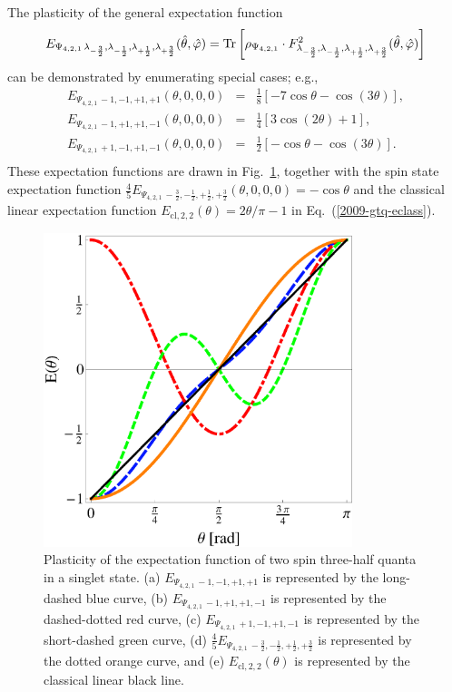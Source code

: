 \documentclass[pra,amsfonts,showpacs,showkeys,preprint]{revtex4}
\begin{document}
The plasticity of the general expectation function
\begin{equation}
E_{{ \Psi_{4,2,1}}\,\lambda_{-\frac{3}{2}},\lambda_{-\frac{1}{2}}, \lambda_{+\frac{1}{2}}, \lambda_{+\frac{3}{2}} } ({\hat \theta},{\hat \varphi} )
=
{\rm Tr}\left[ \rho_{ \Psi_{4,2,1}} \cdot  F^2_{\lambda_{-\frac{3}{2}},\lambda_{-\frac{1}{2}}, \lambda_{+\frac{1}{2}}, \lambda_{+\frac{3}{2}} } ({\hat \theta},{\hat \varphi})\right]
\label{2009-gtq-gpe4}
\end{equation}
can be demonstrated by enumerating special cases; e.g.,
\begin{equation}
\begin{array}{rcl}
E_{{ \Psi_{4,2,1}}\,-1,-1, +1, +1 } ( \theta ,0,0,0 )
&=& \frac{1}{8} \left[-7 \cos \theta -\cos (3 \theta )\right]
,
\\
E_{{ \Psi_{4,2,1}}\,-1,+1, +1, -1 } ( \theta ,0,0,0 )
&=& \frac{1}{4} \left[3 \cos (2 \theta )+1\right]
,
\\
E_{{ \Psi_{4,2,1}}\,+1,-1, +1, -1 } ( \theta ,0,0,0 )
&=& \frac{1}{2} \left[-\cos \theta -\cos (3 \theta )\right]
.
\\
\end{array}
\label{2009-gtq-e4-plast}
\end{equation}
These  expectation functions are drawn in Fig.~\ref{2009-gtq-gr4},
together with the spin state expectation function
$\frac{4}{5}E_{{ \Psi_{4,2,1}}\,-\frac{3}{2},-\frac{1}{2}, +\frac{1}{2}, +\frac{3}{2} }
( \theta ,0,0,0 ) = -\cos \theta $
and the classical linear expectation function
$E_{\text{cl},2,2}(\theta ) = {2 \theta / \pi} - 1$
in Eq.~(\ref{2009-gtq-eclass}).
\begin{figure}[htbp]
  \centering
\includegraphics[width=90mm]{2009-gtq-gr4}
\caption{Plasticity of the expectation function of two spin three-half quanta in a singlet state.
(a) $E_{{ \Psi_{4,2,1}}\,-1,-1, +1, +1 }$ is represented by the long-dashed blue curve,
(b) $E_{{ \Psi_{4,2,1}}\,-1,+1, +1, -1  }$ is represented by the dashed-dotted red curve,
(c) $E_{{ \Psi_{4,2,1}}\,+1,-1, +1, -1  }$ is represented by the short-dashed green curve,
(d) $\frac{4}{5}E_{{ \Psi_{4,2,1}}\,-\frac{3}{2},-\frac{1}{2}, +\frac{1}{2}, +\frac{3}{2} }$ is represented by the dotted orange curve,
and (e) $E_{\text{cl},2,2}(\theta )$ is represented by the classical linear  black line.
}
\label{2009-gtq-gr4}
\end{figure}
\end{document}
